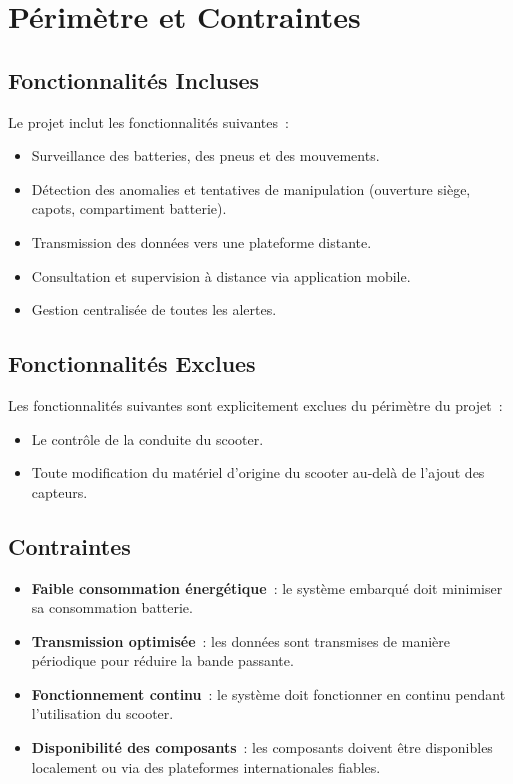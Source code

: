 \documentclass[12pt, a4paper]{report}
\begin{document}
\section{Périmètre et Contraintes}

\subsection{Fonctionnalités Incluses}

Le projet inclut les fonctionnalités suivantes~:

\begin{itemize}
  \item Surveillance des batteries, des pneus et des mouvements.
  \item Détection des anomalies et tentatives de manipulation
        (ouverture siège, capots, compartiment batterie).
  \item Transmission des données vers une plateforme distante.
  \item Consultation et supervision à distance via application mobile.
  \item Gestion centralisée de toutes les alertes.
\end{itemize}

\subsection{Fonctionnalités Exclues}

Les fonctionnalités suivantes sont explicitement exclues du périmètre du projet~:

\begin{itemize}
  \item Le contrôle de la conduite du scooter.
  \item Toute modification du matériel d'origine du scooter au-delà de l'ajout
        des capteurs.
\end{itemize}

\subsection{Contraintes}

\begin{itemize}
  \item \textbf{Faible consommation énergétique}~: le système embarqué doit minimiser
        sa consommation batterie.
  \item \textbf{Transmission optimisée}~: les données sont transmises de manière
        périodique pour réduire la bande passante.
  \item \textbf{Fonctionnement continu}~: le système doit fonctionner en continu
        pendant l'utilisation du scooter.
  \item \textbf{Disponibilité des composants}~: les composants doivent être
        disponibles localement ou via des plateformes internationales fiables.
\end{itemize}
\end{document}
